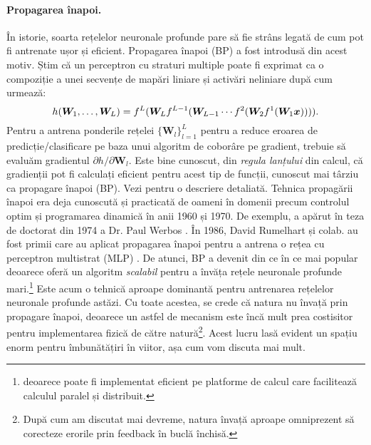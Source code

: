 \documentclass[../../book-main_ro.tex]{subfiles}
\begin{document}
\paragraph{Propagarea înapoi.}
În istorie, soarta rețelelor neuronale profunde pare să fie strâns legată de cum pot fi antrenate ușor și eficient. Propagarea înapoi (BP) a fost introdusă din acest motiv. Știm că un perceptron cu straturi multiple poate fi exprimat ca o compoziție a unei secvențe de mapări liniare și activări neliniare după cum urmează:
\begin{equation}
h(\bm W_1, \ldots, \bm W_L) = f^L(\bm W_Lf^{L-1}(\bm W_{L-1} \cdots f^2(\bm W_2f^1(\bm W_1\bm{x})))).
\end{equation}
Pentru a antrena ponderile rețelei $\{\bm W_l\}_{l=1}^L$ pentru a reduce eroarea de predicție/clasificare pe baza unui algoritm de coborâre pe gradient, trebuie să evaluăm gradientul ${\partial h}/{\partial \bm W_l}$. Este bine cunoscut, din {\em regula lanțului} din calcul, că gradienții pot fi calculați eficient pentru acest tip de funcții, cunoscut mai târziu ca propagare înapoi (BP). Vezi  pentru o descriere detaliată. Tehnica propagării înapoi era deja cunoscută și practicată de oameni în domenii precum controlul optim și programarea dinamică în anii 1960 și 1970. De exemplu, a apărut în teza de doctorat din 1974 a Dr. Paul Werbos \cite{Werbos-1974, Werbos1994TheRO}. În 1986, David Rumelhart și colab. au fost primii care au aplicat propagarea înapoi pentru a antrena o rețea cu perceptron multistrat (MLP) \cite{Rumelhart1986}. De atunci, BP a devenit din ce în ce mai popular deoarece oferă un algoritm {\em scalabil} pentru a învăța rețele neuronale profunde mari.\footnote{deoarece poate fi implementat eficient pe platforme de calcul care facilitează calculul paralel și distribuit.} Este acum o tehnică aproape dominantă pentru antrenarea rețelelor neuronale profunde astăzi. Cu toate acestea, se crede că natura nu învață prin propagare înapoi, deoarece un astfel de mecanism este încă mult prea costisitor pentru implementarea fizică de către natură\footnote{După cum am discutat mai devreme, natura învață aproape omniprezent să corecteze erorile prin feedback în buclă închisă.}. Acest lucru lasă evident un spațiu enorm pentru îmbunătățiri în viitor, așa cum vom discuta mai mult.
\end{document}
